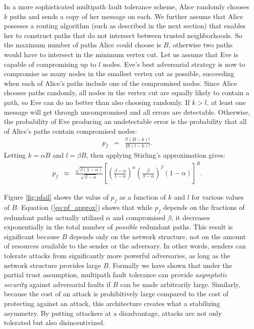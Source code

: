 \documentclass[prodmode,permissions]{acmsmall-ec16}
\newcommand{\beq}{\begin{eqnarray}}
\newcommand{\eeq}{\end{eqnarray}}
\begin{document}
In a more sophisticated multipath fault tolerance scheme,
Alice randomly chooses $k$ paths and sends a copy of
her message on each.
We further assume that Alice posesses a routing algorithm
(such as described in the next section)
that enables her to construct paths that
do not intersect between trusted neighborhoods.
So the maximum number of paths Alice could choose is $B$,
otherwise two paths would have to intersect in the minimum vertex cut.
Let us assume that Eve is capable of compromising up to $l$ nodes.
Eve's best adversarial strategy is now to compromise as many nodes in the smallest
vertex cut as possible,
succeeding when each of Alice's paths include one of the compromised nodes.
Since Alice chooses paths randomly,
all nodes in the vertex cut are equally likely to contain a path,
so Eve can do no better than also choosing randomly.
If $k > l$, at least one message will get through uncompromised and all
errors are detectable.
Otherwise, the probability of Eve producing an undetectable error is
the probability that all of Alice's paths contain compromised nodes:
\beq
\label{eq:pf}
p_f &=& \frac{l!(B-k)!}{B!(l-k)!}.
\eeq
Letting $k=\alpha B$ and $l=\beta B$, then applying Stirling's
approximation gives:
\begin{eqnarray}
\label{eq:pf_approx}
p_f &\approx&
\frac{\sqrt{\beta(1-\alpha)}}{\sqrt{\beta-\alpha}}
\left[
    \left( \frac{\beta-\alpha}{1-\alpha} \right)^{\alpha}
    \left( \frac{\beta}{\beta-\alpha} \right)^{\beta}
    (1-\alpha)
\right]^B.
\end{eqnarray}

Figure \ref{fig:pfail} shows the value of $p_f$
as a function of $k$ and $l$ for various values of $B$.
Equation (\ref{eq:pf_approx}) shows that while $p_f$
depends on the fractions of
redundant paths actually utilized $\alpha$ and compromised $\beta$,
it decreases exponentially in the total number of {\em possible}
redundant paths.
This result is significant because $B$ depends only on the network structure,
not on the amount of resources available to the sender or the adversary.
In other words, senders can tolerate attacks from significantly more powerful
adversaries, as long as the network structure provides large $B$.
Formally we have shown that under the partial trust assumption,
multipath fault tolerance can provide {\em asymptotic security}
against adversarial faults if $B$ can be made arbitrarily large.
Similarly, because the cost of an attack is prohibitively large
compared to the cost of protecting against an attack,
this architecture creates what a stabilizing asymmetry.
By putting attackers at a disadvantage, attacks are not only tolerated
but also disincentivized.
\end{document}
